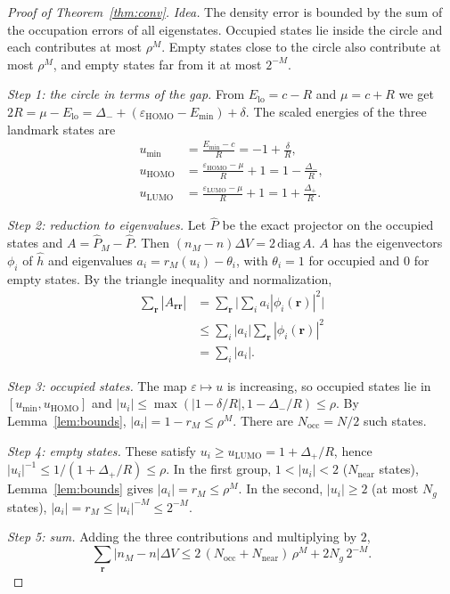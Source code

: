 \documentclass[aps,prb,twocolumn,superscriptaddress,floatfix,longbibliography]{revtex4-2}
\theoremstyle{remark}
\begin{document}
\begin{proof}[Proof of Theorem~\ref{thm:conv}]
\emph{Idea.} The density error is bounded by the sum of the occupation errors of all eigenstates. Occupied states lie inside the
circle and each contributes at most $\rho^M$. Empty states close to the circle also contribute at most $\rho^M$, and empty
states far from it at most $2^{-M}$.

\emph{Step 1: the circle in terms of the gap.} From $E_\mathrm{lo}=c-R$ and $\mu=c+R$ we get
$2R=\mu-E_\mathrm{lo}=\Delta_-+(\varepsilon_\mathrm{HOMO}-E_\mathrm{min})+\delta$. The scaled energies of the three landmark
states are
\begin{align}
u_\mathrm{min}&=\frac{E_\mathrm{min}-c}{R}=-1+\frac{\delta}{R},\nonumber\\
u_\mathrm{HOMO}&=\frac{\varepsilon_\mathrm{HOMO}-\mu}{R}+1=1-\frac{\Delta_-}{R},\nonumber\\
u_\mathrm{LUMO}&=\frac{\varepsilon_\mathrm{LUMO}-\mu}{R}+1=1+\frac{\Delta_+}{R}.
\end{align}

\emph{Step 2: reduction to eigenvalues.} Let $\hat P$ be the exact projector on the occupied states and
$A=\hat P_M-\hat P$. Then $(n_M-n)\Delta V=2\,\mathrm{diag}\,A$. $A$ has the eigenvectors $\phi_i$ of $\hat h$ and
eigenvalues $a_i=r_M(u_i)-\theta_i$, with $\theta_i=1$ for occupied and $0$ for empty states. By the triangle inequality
and normalization,
\begin{align}
\sum_{\bm r}|A_{\bm r\bm r}|
&=\sum_{\bm r}\Big|\sum_ia_i|\phi_i(\bm r)|^2\Big|\nonumber\\
&\le\sum_i|a_i|\sum_{\bm r}|\phi_i(\bm r)|^2\nonumber\\
&=\sum_i|a_i| .
\end{align}

\emph{Step 3: occupied states.} The map $\varepsilon\mapsto u$ is increasing, so occupied states lie in
$[u_\mathrm{min},u_\mathrm{HOMO}]$ and $|u_i|\le\max(|1-\delta/R|,1-\Delta_-/R)\le\rho$. By Lemma~\ref{lem:bounds},
$|a_i|=1-r_M\le\rho^M$. There are $N_\mathrm{occ}=N/2$ such states.

\emph{Step 4: empty states.} These satisfy $u_i\ge u_\mathrm{LUMO}=1+\Delta_+/R$, hence $|u_i|^{-1}\le1/(1+\Delta_+/R)\le\rho$. In
the first group, $1<|u_i|<2$ ($N_\mathrm{near}$ states), Lemma~\ref{lem:bounds} gives $|a_i|=r_M\le\rho^M$. In the second,
$|u_i|\ge2$ (at most $N_g$ states), $|a_i|=r_M\le|u_i|^{-M}\le2^{-M}$.

\emph{Step 5: sum.} Adding the three contributions and multiplying by $2$,
\begin{equation}
\sum_{\bm r}|n_M-n|\Delta V\le2\,(N_\mathrm{occ}+N_\mathrm{near})\,\rho^M+2N_g\,2^{-M}.
\end{equation}
\end{proof}
\end{document}
